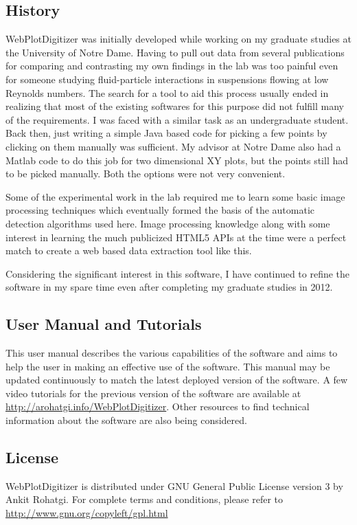 \documentclass[letterpaper, 10pt]{article}
\begin{document}
\subsection{History}
WebPlotDigitizer was initially developed while working on my graduate studies at the University of Notre Dame. Having to pull out data from several publications for comparing and contrasting my own findings in the lab was too painful even for someone studying fluid-particle interactions in suspensions flowing at low Reynolds numbers. The search for a tool to aid this process usually ended in realizing that most of the existing softwares for this purpose did not fulfill many of the requirements. I was faced with a similar task as an undergraduate student. Back then, just writing a simple Java based code for picking a few points by clicking on them manually was sufficient. My advisor at Notre Dame also had a Matlab code to do this job for two dimensional XY plots, but the points still had to be picked manually. Both the options were not very convenient.

Some of the experimental work in the lab required me to learn some basic image processing techniques which eventually formed the basis of the automatic detection algorithms used here. Image processing knowledge along with some interest in learning the much publicized HTML5 APIs at the time were a perfect match to create a web based data extraction tool like this.

Considering the significant interest in this software, I have continued to refine the software in my spare time even after completing my graduate studies in 2012.

\subsection{User Manual and Tutorials}
This user manual describes the various capabilities of the software and aims to help the user in making an effective use of the software. This manual may be updated continuously to match the latest deployed version of the software. A few video tutorials for the previous version of the software are available at \url{http://arohatgi.info/WebPlotDigitizer}. Other resources to find technical information about the software are also being considered.

\subsection{License}
WebPlotDigitizer is distributed under GNU General Public License version 3 by Ankit Rohatgi. For complete terms and conditions, please refer to \url{http://www.gnu.org/copyleft/gpl.html}
\end{document}
